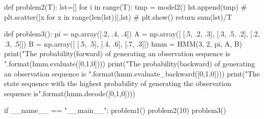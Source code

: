 \documentclass[a4paper,12pt]{ctexart}     %
\begin{document}
\begin{appendix}
\begin{python}
def problem2(T):
	lst=[]
	for i in range(T):
		tmp = model2()
		lst.append(tmp)
	# plt.scatter([x for x in range(len(lst))],lst)
	# plt.show()
	return sum(lst)/T


def problem3():
	pi = np.array([.2, .4, .4])
	A = np.array([
	[.5, .2, .3],
	[.3, .5, .2],
	[.2, .3, .5]])
	B = np.array([
	[.5, .5],
	[.4, .6],
	[.7, .3]])
	hmm = HMM(3, 2, pi, A, B)
	print("The probability(forward) of generating an observation sequence is {}".format(hmm.evaluate([0,1,0]))) 
	print("The probability(backward) of generating an observation sequence is {}".format(hmm.evaluate_backward([0,1,0]))) 
	print("The state sequence with the highest probability of generating the observation sequence is{}".format(hmm.decode([0,1,0])))


if __name__ == "__main__":
	problem1()
	problem2(10)
	problem3()

		
\end{python}
	
	\end{appendix}
\end{document}
